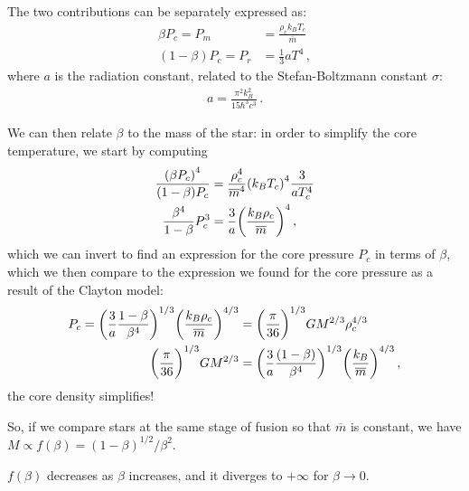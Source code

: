 \documentclass[main.tex]{subfiles}
\begin{document}
The two contributions can be separately expressed as:
%
\begin{align}
  \beta P_c = P_m &= \frac{\rho _c k_B T_c}{\overline{m}} \\
  (1 - \beta ) P_c = P_r &= \frac{1}{3} a T^4
\,,
\end{align}
%
where \(a\) is the radiation constant, related to the Stefan-Boltzmann constant \(\sigma \):
%
\begin{align}
  a = \frac{\pi^2   k_B^2}{15 \hbar^3 c^3}
\,.
\end{align}

We can then relate \(\beta \) to the mass of the star: in order to simplify the core temperature, we start by computing
%
\begin{align}
  \frac{\qty(\beta P_c )^{4}}{(1 - \beta ) P_c} &= \frac{\rho _c^{4}}{\overline{m}^{4}} \qty(k_B T_c)^{4} \frac{3}{a T_c^{4}}  \\
  \frac{\beta^{4}}{1 -\beta } P_c^3 &= \frac{3}{a} \qty(\frac{k_B \rho _c}{\overline{m}})^{4}
\,,
\end{align}
%
which we can invert to find an expression for the core pressure \(P_c \) in terms of \(\beta \), which we then compare to the expression we found for the core pressure as a result of the Clayton model: 
%
\begin{align}
  P_c = \qty(\frac{3}{a} \frac{1 - \beta  }{\beta^{4}})^{1/3} \qty(\frac{k_B \rho _c }{\overline{m}})^{4/3}
  &= \qty(\frac{\pi }{36})^{1/3} G M^{2/3} \rho _c^{4/3} \\
  \qty(\frac{\pi }{36})^{1/3} G M^{2/3} 
  &= \qty(\frac{3}{a} \frac{(1-\beta )}{\beta^{4}})^{1/3}
  \qty(\frac{k_B}{\overline{m}})^{4/3}
  \label{eq:maximum-mass-main-sequence}
\,,
\end{align}
%
the core density simplifies! 

So, if we compare stars at the same stage of fusion so that \(\overline{m}\) is constant, we have \(M \propto f(\beta ) = (1 - \beta )^{1/2} / \beta^2\).  

\(f(\beta )\) decreases as \(\beta \) increases, and it diverges to \(+ \infty \) for \(\beta \to 0\). 
\end{document}
